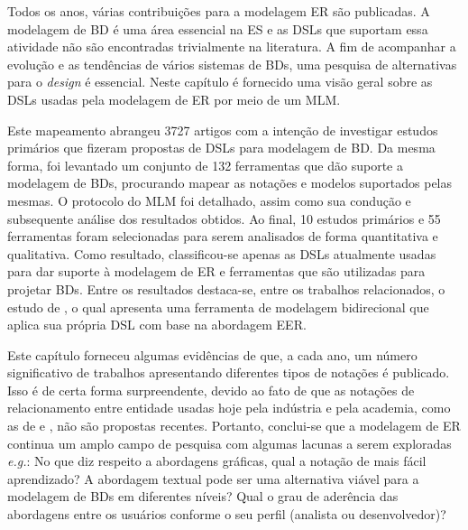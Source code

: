 Todos os anos, várias contribuições para a modelagem \ac{ER} são publicadas. 
A modelagem de \ac{BD} é uma área essencial na \ac{ES} e as \acp{DSL} que suportam essa atividade não são encontradas trivialmente na literatura.
A fim de acompanhar a evolução e as tendências de vários sistemas de \acp{BD}, uma pesquisa de alternativas para o \textit{design} é essencial. 
Neste capítulo é fornecido uma visão geral sobre as \acp{DSL} usadas pela modelagem de \ac{ER} por meio de um \ac{MLM}.


Este mapeamento abrangeu 3727 artigos com a intenção de investigar estudos primários que fizeram propostas de \acp{DSL} para modelagem de \ac{BD}. 
Da mesma forma, foi levantado um conjunto de 132 ferramentas que dão suporte a modelagem de \acp{BD}, procurando mapear as notações e modelos suportados pelas mesmas.
O protocolo do \ac{MLM} foi detalhado, assim como sua condução e subsequente análise dos resultados obtidos.
Ao final, 10 estudos primários e 55 ferramentas foram selecionadas para serem analisados de forma quantitativa e qualitativa. 
Como resultado, classificou-se apenas as \acp{DSL} atualmente usadas para dar suporte à modelagem de \ac{ER} e ferramentas que são utilizadas para projetar \acp{BD}.
Entre os resultados destaca-se, entre os trabalhos relacionados, o estudo de , o qual apresenta uma ferramenta de modelagem bidirecional que aplica sua própria \ac{DSL} com base na abordagem \ac{EER}.

Este capítulo forneceu algumas evidências de que, a cada ano, um número significativo de trabalhos apresentando diferentes tipos de notações é publicado.
Isso é de certa forma surpreendente, devido ao fato de que as notações de relacionamento entre entidade usadas hoje pela indústria e pela academia, como as de  e , não são propostas recentes.
Portanto, conclui-se que a modelagem de \ac{ER} continua um amplo campo de pesquisa com algumas lacunas a serem exploradas \textit{e.g.}: No que diz respeito a abordagens gráficas, qual a notação de mais fácil aprendizado? A abordagem textual pode ser uma alternativa viável para a modelagem de \acp{BD} em diferentes níveis? Qual o grau de aderência das abordagens entre os usuários conforme o seu perfil (analista ou desenvolvedor)?

